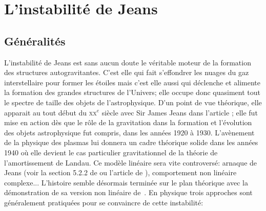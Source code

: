 \section{L'instabilité de Jeans}\label{Chap::Instabilite::Sec::Jeans}

\subsection{Généralités}

L'instabilité de Jeans est sans aucun doute le véritable moteur de la formation des structures autogravitantes. C'est elle qui fait s'effondrer les
nuages du gaz interstellaire pour former les étoiles mais c'est elle aussi qui déclenche et alimente la formation des grandes structures de l'Univers;
elle occupe donc quasiment tout le spectre de taille des objets de l'astrophysique. D'un point de vue théorique, elle apparait au tout début du
\textsc{xx}$^e$ siècle avec Sir James Jeans dans l'article \cite{jeans02}; elle fut mise en action dès que le rôle de la gravitation dans la formation
et l'évolution  des objets astrophysique fut compris, dans les années 1920 à 1930. L'avènement de la physique des plasmas lui donnera un
cadre théorique solide dans les années 1940 où elle devient le cas particulier gravitationnel de la théorie de l'amortissement de Landau. Ce modèle
linéaire sera vite controversé: arnaque de Jeans (voir la section 5.2.2 de \cite{2008gady.book.....B}  ou l'article de
\cite{kiessling}), comportement non linéaire complexe... L'histoire semble désormais terminée sur le plan théorique avec la démonstration de sa
version non linéaire de~\citet{mouhot2011landau}. En physique trois approches sont généralement pratiquées pour se convaincre de
cette instabilité:
